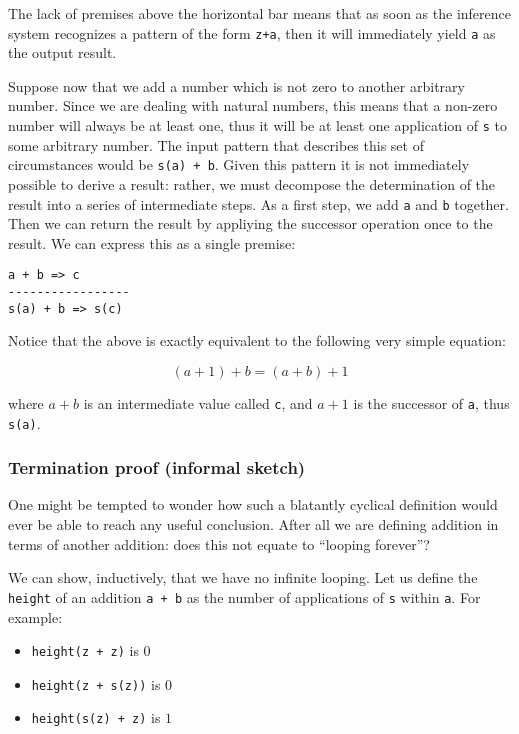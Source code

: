 The lack of premises above the horizontal bar means that as soon as the inference system recognizes a pattern of the form \texttt{z+a}, then it will immediately yield \texttt{a} as the output result.

Suppose now that we add a number which is not zero to another arbitrary number. Since we are dealing with natural numbers, this means that a non-zero number will always be at least one, thus it will be at least one application of \texttt{s} to some arbitrary number. The input pattern that describes this set of circumstances would be \texttt{s(a) + b}. Given this pattern it is not immediately possible to derive a result: rather, we must decompose the determination of the result into a series of intermediate steps. As a first step, we add \texttt{a} and \texttt{b} together. Then we can return the result by appliying the successor operation once to the result. We can express this as a single premise:

\begin{lstlisting}
a + b => c
-----------------
s(a) + b => s(c)
\end{lstlisting}

Notice that the above is exactly equivalent to the following very simple equation:

$$(a+1) + b = (a+b)+1$$

where $a+b$ is an intermediate value called \texttt{c}, and $a+1$ is the successor of \texttt{a}, thus \texttt{s(a)}.


\subsubsection{Termination proof (informal sketch)}
One might be tempted to wonder how such a blatantly cyclical definition would ever be able to reach any useful conclusion. After all we are defining addition in terms of another addition: does this not equate to ``looping forever''?

We can show, inductively, that we have no infinite looping. Let us define the \texttt{height} of an addition \texttt{a + b} as the number of applications of \texttt{s} within \texttt{a}. For example:

\begin{itemize}
\item \texttt{height(z + z)} is $0$
\item \texttt{height(z + s(z))} is $0$
\item \texttt{height(s(z) + z)} is $1$
\end{itemize}

